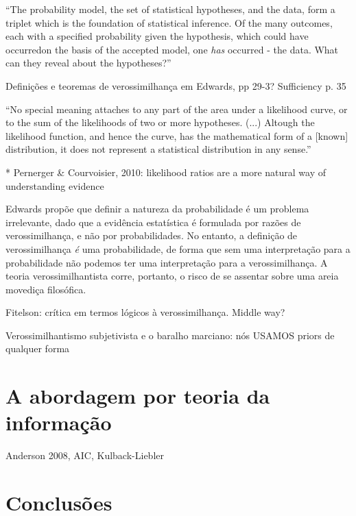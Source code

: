 ``The probability model, the set of statistical hypotheses, and the data, form a triplet which is the foundation of
statistical inference. Of the many outcomes, each with a specified probability given the hypothesis, which could have
occurredon the basis of the accepted model, one {\em has} occurred - the data. What can they reveal about the hypotheses?''
\citep{Edwards72}


Definições e teoremas de verossimilhança em Edwards, pp 29-3?
Sufficiency p. 35

``No special meaning attaches to any part of the area under a likelihood curve, or to the sum of the likelihoods of two or more
hypotheses.
(...)
Altough the likelihood function, and hence the curve, has the mathematical form of a [known] distribution, it does not
represent a statistical distribution in any sense.'' \citep{Edwards72}

* Pernerger \& Courvoisier, 2010: likelihood ratios are a more natural way of understanding evidence

Edwards propõe que definir a natureza da probabilidade é um problema irrelevante, dado que a evidência estatística é
formulada por razões de verossimilhança, e não por probabilidades. No entanto, a definição de verossimilhança {\em é} uma
probabilidade, de forma que sem uma interpretação para a probabilidade não podemos ter uma interpretação para a verossimilhança.
A teoria verossimilhantista corre, portanto, o risco de se assentar sobre uma areia movediça filosófica.

Fitelson: crítica em termos lógicos à verossimilhança. Middle way?

Verossimilhantismo subjetivista e o baralho marciano: nós USAMOS priors de qualquer forma

\section{A abordagem por teoria da informação}

Anderson 2008, AIC, Kulback-Liebler

\section{Conclusões}

